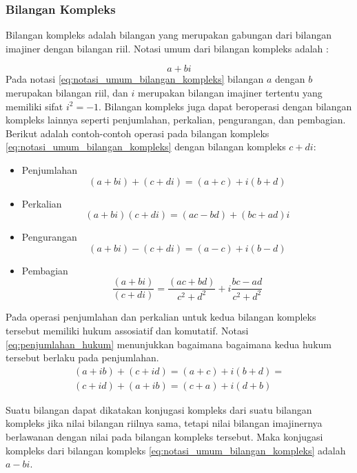 \subsubsection{Bilangan Kompleks}
\label{sssec:bilangan_kompleks}
\cite{kuipers:1999}
Bilangan kompleks adalah bilangan yang merupakan gabungan dari bilangan imajiner dengan bilangan riil. Notasi umum dari bilangan kompleks adalah :

\begin{equation}
	a+bi
\label{eq:notasi_umum_bilangan_kompleks}
\end{equation}
Pada notasi \ref{eq:notasi_umum_bilangan_kompleks} bilangan \(a\) dengan \(b\) merupakan bilangan riil, dan \(i\) merupakan bilangan imajiner tertentu yang memiliki sifat \(i^2=-1\). Bilangan kompleks juga dapat beroperasi dengan bilangan kompleks lainnya seperti penjumlahan, perkalian, pengurangan, dan pembagian. Berikut adalah contoh-contoh operasi pada bilangan kompleks \ref{eq:notasi_umum_bilangan_kompleks} dengan bilangan kompleks \(c+di\):
\begin{itemize}
	\item Penjumlahan\\
	\[
	 (a + bi) + (c + di) = (a+c) + i(b+d)
	\]
	\item Perkalian\\
	\[
	 (a + bi)(c + di) = (ac−bd) + (bc+ad)i
	\]
	\item Pengurangan\\
	\[
	 (a + bi) - (c + di) = (a-c) + i(b-d)
	\]
	\item Pembagian\\
	\[
	 \frac{(a + bi)}{(c + di)} = \frac{(ac+bd)}{c^2+d^2} + i \frac{bc-ad}{c^2+d^2}
	\]
\end{itemize}
Pada operasi penjumlahan dan perkalian untuk kedua bilangan kompleks tersebut memiliki hukum assosiatif dan komutatif. Notasi \ref{eq:penjumlahan_hukum} menunjukkan bagaimana bagaimana kedua hukum tersebut berlaku pada penjumlahan.
\begin{equation}
	\begin{split}
	(a+ib) + (c+id) = (a+c) + i(b+d)=\\
	(c+id) + (a+ib) = (c+a) + i(d+b)
	\end{split}
\label{eq:penjumlahan_hukum}
\end{equation}

Suatu bilangan dapat dikatakan konjugasi kompleks dari suatu bilangan kompleks jika nilai bilangan riilnya sama, tetapi nilai bilangan imajinernya berlawanan dengan nilai pada bilangan kompleks tersebut. Maka konjugasi kompleks dari bilangan kompleks \ref{eq:notasi_umum_bilangan_kompleks} adalah \(a-bi\). 


